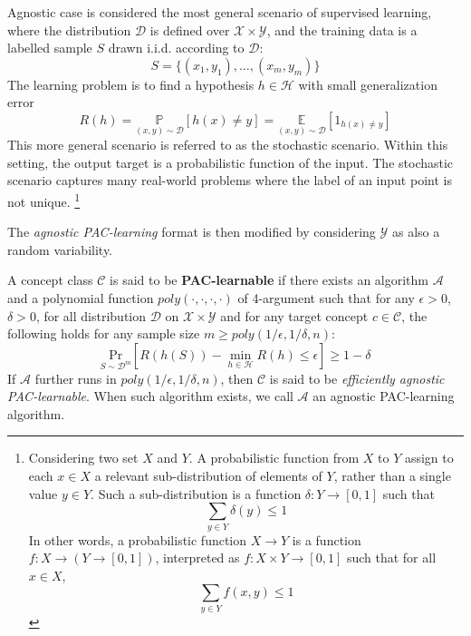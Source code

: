 Agnostic case is considered the most general scenario of supervised learning, where the distribution $\mathcal{D}$ is defined over $\mathcal{X}\times \mathcal{Y}$, and the training data is a labelled sample $S$ drawn i.i.d. according to $\mathcal{D}$: 
$$S=\{ (x_{1},y_{1}),\dots,(x_{m},y_{m}) \}$$
The learning problem is to find a hypothesis $h\in \mathcal{H}$ with small generalization error
\begin{equation}
    R(h)=\underset{(x,y)\sim \mathcal{D}}{\mathbb{P}}[h(x)\neq y]=\underset{(x,y)\sim \mathcal{D}}{\mathbb{E}}[1_{h(x)\neq y}]
\end{equation}
This more general scenario is referred to as the stochastic scenario. Within this setting, the output target is a probabilistic function of the input. The stochastic scenario captures many real-world problems where the label of an input point is not unique. \footnote{
    Considering two set $X$ and $Y$. A probabilistic function from $X$ to $Y$ assign to each $x\in X$ a relevant sub-distribution of elements of $Y$, rather than a single value $y\in Y$. Such a sub-distribution is a function $\delta: Y \to [0,1]$ such that $$\sum_{y\in Y}\delta(y)\leq 1$$In other words, a probabilistic function $X\to Y$ is a function $f: X\to (Y\to[0,1])$, interpreted as $f: X \times Y\to[0,1]$ such that for all $x\in X$, $$\sum_{y\in Y}f(x,y)\leq 1$$
}

The \textit{agnostic PAC-learning} format is then modified by considering $\mathcal{Y}$ as also a random variability. 
\begin{definition}
    A concept class $\mathcal{C}$ is said to be \textbf{PAC-learnable} if there exists an algorithm $\mathcal{A}$ and a polynomial function $poly(\cdot,\cdot,\cdot,\cdot)$ of 4-argument such that for any $\epsilon>0$, $\delta>0$, for all distribution $\mathcal{D}$  on $\mathcal{X}\times \mathcal{Y}$ and for any target concept $c\in\mathcal{C}$, the following holds for any sample size $m\geq poly(1/\epsilon,1/\delta,n)$:
    \begin{equation}
        \underset{S\sim \mathcal{D}^{m}}{\mathrm{Pr}}\left[ R(h(S))- \min_{h\in\mathcal{H}}R(h)\leq \epsilon \right]\geq 1-\delta
    \end{equation}
    If $\mathcal{A}$ further runs in $poly(1/\epsilon,1/\delta,n)$, then $\mathcal{C}$ is said to be \textit{efficiently agnostic PAC-learnable}. When such algorithm exists, we call $\mathcal{A}$ an agnostic PAC-learning algorithm.
\end{definition}



